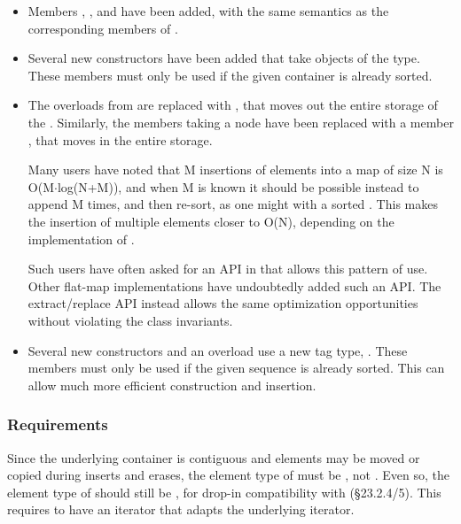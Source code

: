 \begin{itemize}
  \item Members , , and 
    have been added, with the same semantics as the corresponding members of
    .

  \item Several new constructors have been added that take objects of the
     type.  These members must only be used if the given
    container is already sorted.

  \item The  overloads from  are replaced with
    , that moves out the entire storage of the
    .  Similarly, the  members taking a node
    have been replaced with a member , that
    moves in the entire storage.

    Many users have noted that M insertions of elements into a map of size N
    is O(M$\cdot$log(N+M)), and when M is known it should be possible instead
    to append M times, and then re-sort, as one might with a sorted
    .  This makes the insertion of multiple elements closer to
    O(N), depending on the implementation of .

    Such users have often asked for an API in
     that allows this pattern of use.  Other
    flat-map implementations have undoubtedly added such an API.  The
    extract/replace API instead allows the same optimization opportunities
    without violating the class invariants.

  \item Several new constructors and an  overload use a new tag
    type, .  These members must only be used
    if the given sequence is already sorted.  This can allow much more
    efficient construction and insertion.
\end{itemize}

\subsubsection{ Requirements}

Since the underlying container is contiguous and elements may be moved or
copied during inserts and erases, the element type of  must be
, not .  Even so, the element type
of  should still be , for drop-in
compatibility with  (\S23.2.4/5).  This requires  to
have an iterator that adapts the underlying  iterator.

